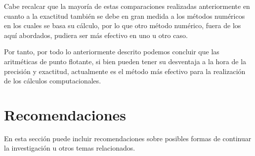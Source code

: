 \documentclass[a4paper,10pt,twocolumn]{article}
\begin{document}
  Cabe recalcar que la mayoría de estas comparaciones realizadas anteriormente en cuanto a la exactitud también se debe en gran medida a los métodos numéricos en los cuales se basa su cálculo, por lo que otro método numérico, fuera de los aquí abordados, pudiera ser más efectivo en uno u otro caso. 
  
  Por tanto, por todo lo anteriormente descrito podemos concluir que las aritméticas de punto flotante, si bien pueden tener su desventaja a la hora de la precisión y exactitud, actualmente es el método más efectivo para la realización de los cálculos computacionales.




\section{Recomendaciones}\label{sec:rec}

  En esta sección puede incluir recomendaciones sobre posibles formas de continuar
  la investigación u otros temas relacionados.

\end{document}
